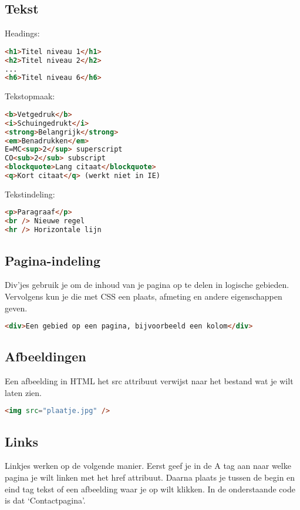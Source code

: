 \documentclass[8pt,pagesize,footinclude=false,headinclude=false]{scrartcl}
\begin{document}
\begin{multicols*}{4}
\subsection*{Tekst}
Headings:
\begin{lstlisting}[language=HTML]
<h1>Titel niveau 1</h1>
<h2>Titel niveau 2</h2>
...
<h6>Titel niveau 6</h6>
\end{lstlisting}

\noindent Tekstopmaak:
\begin{lstlisting}[language=HTML]
<b>Vetgedruk</b>
<i>Schuingedrukt</i>
<strong>Belangrijk</strong>
<em>Benadrukken</em>
E=MC<sup>2</sup> superscript
CO<sub>2</sub> subscript
<blockquote>Lang citaat</blockquote>
<q>Kort citaat</q> (werkt niet in IE)
\end{lstlisting}

\noindent Tekstindeling:
\begin{lstlisting}[language=HTML]
<p>Paragraaf</p>
<br /> Nieuwe regel
<hr /> Horizontale lijn
\end{lstlisting}

\subsection*{Pagina-indeling}
Div'jes gebruik je om de inhoud van je pagina op te delen in logische gebieden. Vervolgens kun je die met CSS een plaats, afmeting en andere eigenschappen geven. 
\begin{lstlisting}[language=HTML]
<div>Een gebied op een pagina, bijvoorbeeld een kolom</div>
\end{lstlisting}

\subsection*{Afbeeldingen}
Een afbeelding in HTML het src attribuut verwijst naar het bestand wat je wilt laten zien.
\begin{lstlisting}[language=HTML]
<img src="plaatje.jpg" />
\end{lstlisting}

\subsection*{Links}
Linkjes werken op de volgende manier. Eerst geef je in de A tag aan naar welke pagina je wilt linken met het href attribuut. Daarna plaats je tussen de begin en eind tag tekst of een afbeelding waar je op wilt klikken. In de onderstaande code is dat `Contactpagina'.


\end{multicols*}
\end{document}
